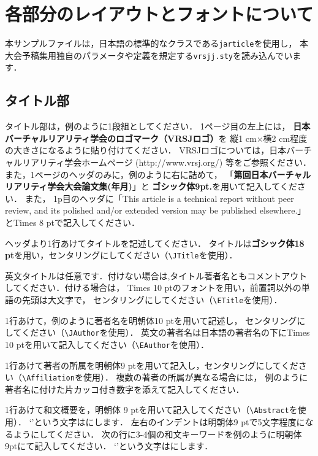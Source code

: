 \documentclass[a4paper]{jarticle}
\newcounter{vrsjyear}
\newcounter{vrsjmonth}
\newcounter{vrsjnum}
\begin{document}
\section{各部分のレイアウトとフォントについて}%

本サンプルファイルは，日本語\LaTeXe の標準的なクラスである\verb+jarticle+を使用し，
本大会予稿集用独自のパラメータや定義を規定する\verb+vrsjj.sty+を読み込んでいます．

\subsection{タイトル部}

タイトル部は，例のように1段組としてください．
1ページ目の左上には，
{\bf 日本バーチャルリアリティ学会のロゴマーク（VRSJロゴ）}を
縦1 cm×横2 cm程度の大きさになるように貼り付けてください．
VRSJロゴについては，日本バーチャルリアリティ学会ホームページ
 (http://www.vrsj.org/) 等をご参照ください．
また，1ページのヘッダのみに，例のように右に詰めて，
「{\bf 第回日本バーチャルリアリティ学会大会論文集(年月)}」と
{\bf ゴシック体9pt.}を用いて記入してください．
また，
1p目のヘッダに「This article is a technical report without peer review, and its polished and/or extended version may be published elsewhere.」と{\footnotesize Times 8 pt}で記入してください．

ヘッダより1行あけてタイトルを記述してください．
タイトルは{\bf ゴシック体18 pt}を用い，センタリングにしてください（\verb+\JTitle+を使用）．

英文タイトルは任意です．付けない場合は,タイトル著者名ともコメントアウトしてください．付ける場合は，
{\normalsize Times 10 pt}のフォントを用い，前置詞以外の単語の先頭は大文字で，
センタリングにしてください（\verb+\ETitle+を使用）．

1行あけて，例のように著者名を{\normalsize 明朝体10 pt}を用いて記述し，
センタリングにしてください（\verb+\JAuthor+を使用）．
英文の著者名は日本語の著者名の下にTimes 10 ptを用いて記入してください（\verb+\EAuthor+を使用）．

1行あけて著者の所属を明朝体9 ptを用いて記入し，センタリングにしてください（\verb+\Affiliation+を使用）．
複数の著者の所属が異なる場合には，
例のように著者名に付けた片カッコ付き数字を添えて記入してください．

1行あけて和文概要を，明朝体 9 ptを用いて記入してください（\verb+\Abstract+を使用）．
`'という文字はにします．
左右のインデントは明朝体9 ptで5文字程度になるようにしてください．
次の行に3-4個の和文キーワードを例のように明朝体9ptにて記入してください．
`'という文字はにします．
\end{document}
